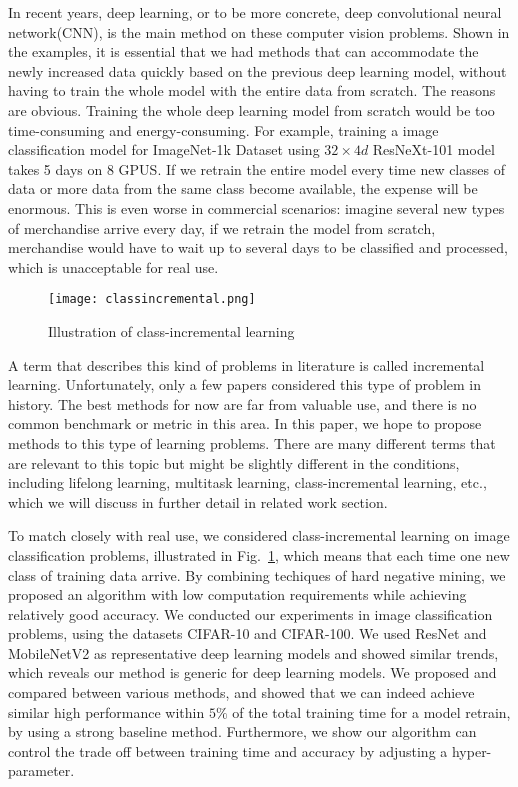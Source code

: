 In recent years, deep learning, or to be more concrete, deep convolutional neural network(CNN), is the main method on these computer vision problems. Shown in the examples, it is essential that we had methods that can accommodate the newly increased data quickly based on the previous deep learning model, without having to train the whole model with the entire data from scratch. The reasons are obvious. Training the whole deep learning model from scratch would be too time-consuming and energy-consuming. For example, training a image classification model for ImageNet-1k Dataset\cite{deng2009imagenet} using $32\times4d$ ResNeXt-101\cite{xie2017aggregated} model takes 5 days on 8 GPUS. If we retrain the entire model every time new classes of data or more data from the same class become available, the expense will be enormous. This is even worse in commercial scenarios: imagine several new types of merchandise arrive every day, if we retrain the model from scratch, merchandise would have to wait up to several days to be classified and processed, which is unacceptable for real use.
\begin{figure}[!htp]
	\centering
	\texttt{[image: classincremental.png]}
	\caption[Illustration of class-incremental learning]
	{Illustration of class-incremental learning}
	\label{fig:classincremental}
\end{figure}
A term that describes this kind of problems in literature is called incremental learning. Unfortunately, only a few papers considered this type of problem in history. The best methods for now are far from valuable use, and there is no common benchmark or metric in this area. In this paper, we hope to propose methods to this type of learning problems. There are many different terms that are relevant to this topic but might be slightly different in the conditions, including lifelong learning, multitask learning, class-incremental learning, etc.\cite{utgoff1989incremental}, which we will discuss in further detail in related work section.

To match closely with real use, we considered class-incremental learning on image classification problems, illustrated in Fig.~\ref{fig:classincremental}, which means that each time one new class of training data arrive. By combining techiques of hard negative mining, we proposed an algorithm with low computation requirements while achieving relatively good accuracy. We conducted our experiments in image classification problems, using the datasets CIFAR-10 and CIFAR-100\cite{krizhevsky2009learning}. We used ResNet\cite{he2016deep} and MobileNetV2\cite{sandler2018inverted} as representative deep learning models and showed similar trends, which reveals our method is generic for deep learning models. We proposed and compared between various methods, and showed that we can indeed achieve similar high performance within $5\%$ of the total training time for a model retrain, by using a strong baseline method. Furthermore, we show our algorithm can control the trade off between training time and accuracy by adjusting a hyper-parameter.

